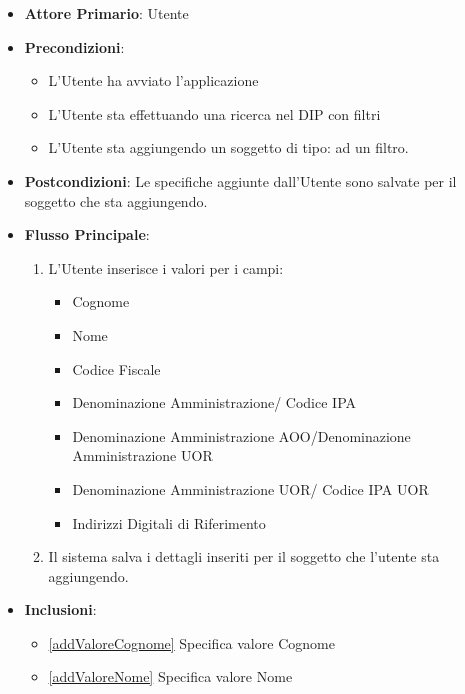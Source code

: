 \begin{itemize}
      \item \textbf{Attore Primario}: Utente
      \item \textbf{Precondizioni}: \begin{itemize}
            \item L'Utente ha avviato l'applicazione
            \item L'Utente sta effettuando una ricerca nel DIP con filtri
            \item L'Utente sta aggiungendo un soggetto di tipo:  ad un filtro.
      \end{itemize}
      \item \textbf{Postcondizioni}:  Le specifiche aggiunte dall'Utente sono salvate per il soggetto che sta aggiungendo.
      \item \textbf{Flusso Principale}:
            \begin{enumerate}
                  \item L'Utente inserisce i valori per i campi:
                        \begin{itemize}
                              \item Cognome
                              \item Nome
                              \item Codice Fiscale
                              \item Denominazione Amministrazione/ Codice IPA
                              \item Denominazione Amministrazione AOO/Denominazione Amministrazione UOR
                              \item Denominazione Amministrazione UOR/ Codice IPA UOR
                              \item Indirizzi Digitali di Riferimento
                        \end{itemize}
                  \item Il sistema salva i dettagli inseriti per il soggetto che l'utente sta aggiungendo.
            \end{enumerate}
      \item \textbf{Inclusioni}: \begin{itemize}
            \item \ref{addValoreCognome} Specifica valore Cognome
            \item \ref{addValoreNome} Specifica valore Nome

\end{itemize}
\end{itemize}
